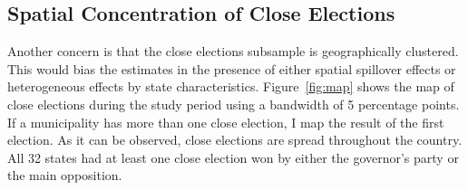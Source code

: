 \documentclass[dv_diss_main.tex]{subfiles}
\begin{document}
\subsection{Spatial Concentration of Close Elections} Another concern is that the close elections subsample is geographically clustered. This would bias the estimates in the presence of  either spatial spillover effects or heterogeneous effects by state characteristics. Figure~\ref{fig:map} shows the map of close elections during the study period using a bandwidth of 5 percentage points. If a municipality has more than one close election, I map the result of the first election. As it can be observed, close elections are spread throughout the country. All 32 states had at least one close election won by either the governor's party or the main opposition. 



\end{document}
